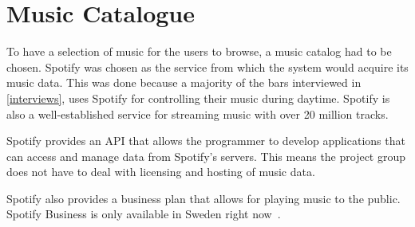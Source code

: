 \section{Music Catalogue}
\label{sec:Music_catalog}
To have a selection of music for the users to browse, a music catalog had to be chosen. Spotify was chosen as the service from which the system would acquire its music data. This was done because a majority of the bars interviewed in \cref{interviews}, uses Spotify for controlling their music during daytime. Spotify is also a well-established service for streaming music with over 20 million tracks.

Spotify provides an API that allows the programmer to develop applications that can access and manage data from Spotify’s servers. This means the project group does not have to deal with licensing and hosting of music data.

Spotify also provides a business plan that allows for playing music to the public. Spotify Business is only available in Sweden right now~\cite{spotifyBusiness}.
